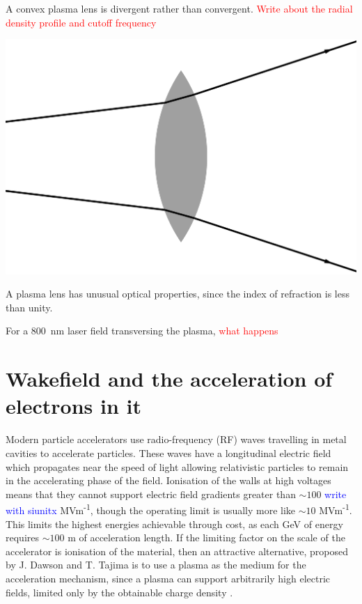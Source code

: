 \documentclass[justified,nofonts,nobib]{tufte-book}
\begin{document}
A convex plasma lens is divergent rather than convergent.
\textcolor{red}{Write about the radial density profile and cutoff frequency}
\begin{marginfigure}
    \includegraphics[width=\marginparwidth]{figures/chen4_30.pdf}
    \caption{A plasma lens has unusual optical properties, since the index of refraction is less than unity.}
    \label{fig:plasma_lens_chen}
\end{marginfigure}
For a \SI{800}{\nm} laser field transversing the plasma, \textcolor{red}{what happens}

\section{Wakefield and the acceleration of electrons in it}\label{sec:wakefield} 
Modern particle accelerators use radio-frequency (RF) waves travelling in metal cavities to accelerate particles. These waves have a longitudinal electric field which propagates near the speed of light allowing relativistic particles to remain in the accelerating phase of the field. Ionisation of the walls at high voltages means that they cannot support electric field gradients greater than $\sim 100$ \textcolor{blue}{write with siunitx} MVm\textsuperscript{-1}, though the operating limit is usually more like $\sim 10$ MVm\textsuperscript{-1}. This limits the highest energies achievable through cost, as each GeV of energy requires $\sim 100$ m of acceleration length.
If the limiting factor on the scale of the accelerator is ionisation of the material, then an attractive alternative, proposed by J. Dawson and T. Tajima\cite{Dawson1979} is to use a plasma as the medium for the acceleration mechanism, since a plasma can support arbitrarily high electric fields, limited only by the obtainable charge density \cite{Esarey2009PhysicsAccelerators}.
\end{document}
